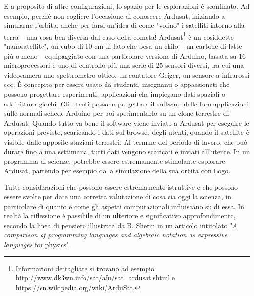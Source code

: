 E a proposito di altre configurazioni, lo spazio per le esplorazioni è
sconfinato. Ad esempio, perché non cogliere l'occasione di conoscere Ardusat,
iniziando a simularne l'orbita, anche per farsi un'idea di come "volino" i
satelliti intorno alla terra – una cosa ben diversa dal caso della cometa!
Ardusat\footnote{Informazioni dettagliate si trovano ad esempio
http://www.dk3wn.info/sat/afu/sat\_ardusat.shtml e https://en.wikipedia.org/wiki/ArduSat.} è un cosiddetto "nanosatellite", un cubo di 10 cm di lato che pesa un
chilo – un cartone di latte più o meno – equipaggiato con una particolare
versione di Arduino, basata su 16 microprocessori e uno di controllo più una
serie di 25 sensori diversi, fra cui una videocamera uno spettrometro ottico,
un contatore Geiger, un sensore a infrarossi ecc. È  concepito per essere usato
da studenti, insegnanti o appassionati che possono progettare esperimenti,
applicazioni che impiegano dati spaziali o addirittura giochi. Gli utenti
possono progettare il software delle loro applicazioni sulle normali schede
Arduino per poi sperimentarlo su un clone terrestre di
Ardusat. Quando tutto va bene il software viene inviato a Ardusat per eseguire le operazioni previste, scaricando i dati sul browser degli utenti, quando il satellite è visibile dalle apposite stazioni terrestri. Al termine del periodo di lavoro, che può durare fino a una settimana, tutti dati vengono scaricati e inviati all'utente. In un programma di scienze, potrebbe essere estremamente stimolante esplorare Ardusat, partendo per esempio dalla simulazione della sua orbita con Logo.

Tutte considerazioni che possono essere estremamente istruttive e che possono essere svolte per dare una corretta valutazione di cosa sia oggi la scienza, in particolare di quanto e come gli aspetti computazionali influiscano su di essa. In realtà la riflessione è passibile di un ulteriore e significativo approfondimento, secondo la linea di pensiero illustrata da B. Sherin in un articolo intitolato "\textit{A comparison of programming languages and algebraic notation as expressive languages} for physics"\cite{Sherin}.

